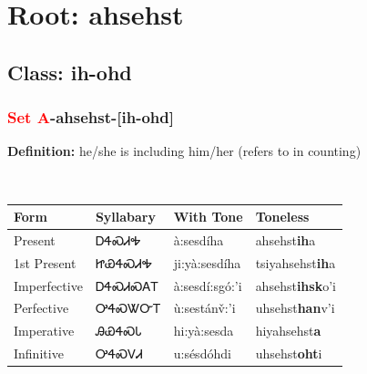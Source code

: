 \needspace{4in}
\section*{Root: ahsehst}
\nopagebreak
{}
\needspace{3in}
\subsection*{Class: ih-ohd}
\nopagebreak
\needspace{2in}
\subsubsection*{\textcolor{Red}{Set A}{-}\textbf{ahsehst}{-}[ih-ohd]}
\nopagebreak
\textbf{Definition: } he/she is including him/her (refers to in counting)
\\[0.5em]
\begin{tabularx}{\textwidth}{l X X X}%
\toprule%
\textbf{Form}&\textbf{Syllabary}&\textbf{With Tone}&\textbf{Toneless}\\%
\midrule%
Present&ᎠᏎᏍᏗᎭ&à:sesdíha&ahsehst\textbf{ih}a\\%
1st Present&ᏥᏯᏎᏍᏗᎭ&ji:yà:sesdíha&tsiyahsehst\textbf{ih}a\\%
Imperfective&ᎠᏎᏍᏗᏍᎪᎢ&à:sesdí:sgó:’i&ahsehst\textbf{ihsk}o'i\\%
Perfective&ᎤᏎᏍᏔᏅᎢ&ù:sestánv̌:’i&uhsehst\textbf{han}v'i\\%
Imperative&ᎯᏯᏎᏍᏓ&hi:yà:sesda&hiyahsehst\textbf{a}\\%
Infinitive&ᎤᏎᏍᏙᏗ&u:sésdóhdi&uhsehst\textbf{oht}i\\%
\bottomrule%
\end{tabularx}
\\[1em]